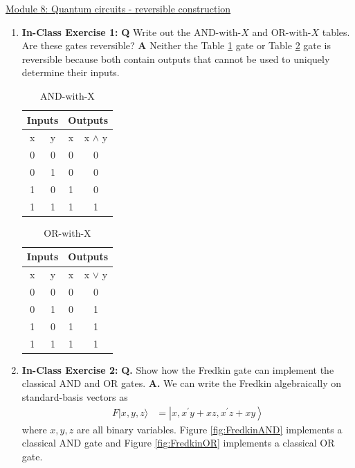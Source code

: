 \documentclass[main.tex]{subfiles}
\begin{document}
\href{https://www2.seas.gwu.edu/~simhaweb/quantum/modules/module8/module8.html}{Module 8: Quantum circuits - reversible construction}\\

\begin{enumerate}

\item[] \textbf{In-Class Exercise 1:} \textbf{Q} Write out the AND-with-$X$ and OR-with-$X$ tables. Are these gates reversible? 
    \textbf{A} Neither the Table \ref{tab:AndX} gate or Table \ref{tab:OrX} gate is reversible because both contain outputs that cannot be used to uniquely determine their inputs.
    \begin{table}
    \centering
    \begin{tabular}{ |c|c|c|c| } 
     \hline
     \multicolumn{2}{|c|}{Inputs} & \multicolumn{2}{c|}{Outputs} \\ 
     \hline
     x & y & x & x $\wedge$ y \\ 
     \hline
     0 & 0 & 0 & 0 \\ 
     \hline
     0 & 1 & 0 & 0 \\ 
     \hline
     1 & 0 & 1 & 0 \\ 
     \hline
     1 & 1 & 1 & 1 \\ 
     \hline
    \end{tabular}
    \caption{AND-with-X}
    \label{tab:AndX}
    \end{table}
    
    \begin{table}
    \centering
    \begin{tabular}{ |c|c|c|c| } 
     \hline
     \multicolumn{2}{|c|}{Inputs} & \multicolumn{2}{c|}{Outputs} \\ 
     \hline
     x & y & x & x $\vee$ y \\ 
     \hline
     0 & 0 & 0 & 0 \\ 
     \hline
     0 & 1 & 0 & 1 \\ 
     \hline
     1 & 0 & 1 & 1 \\ 
     \hline
     1 & 1 & 1 & 1 \\ 
     \hline
    \end{tabular}
    \caption{OR-with-X}
    \label{tab:OrX}
    \end{table}

\item[] \textbf{In-Class Exercise 2:} \textbf{Q.} Show how the Fredkin gate can implement the classical AND and OR gates. 
    \textbf{A.} We can write the Fredkin algebraically on standard-basis vectors as 
    \begin{align*}
        F|x, y, z\rangle & = \left|x, x^{\prime} y+x z, x^{\prime} z+x y\right\rangle
    \end{align*}
    where $x, y, z$ are all binary variables. Figure \ref{fig:FredkinAND} implements a classical AND gate and Figure \ref{fig:FredkinOR} implements a classical OR gate. 


\end{enumerate}
\end{document}
